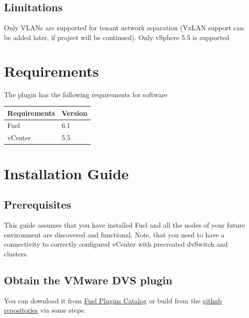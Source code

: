 \documentclass{article}
\begin{document}
\subsection{Limitations}
  Only VLANs are supported for tenant network separation (VxLAN support can be added later, if project will be continued).
  Only vSphere 5.5 is supported

\section{Requirements}

The plugin has the following requirements for software

\begin{table}[h]
\begin{tabular}{|p{8cm}|p{8cm}|}
\hline
\textbf{Requirements} & \textbf{Version} \\ \hline
Fuel & 6.1 \\ \hline
vCenter & 5.5 \\ \hline
\end{tabular}
\end{table}

\section{Installation Guide}

\subsection{Prerequisites}

This guide assumes that you have installed Fuel and all the nodes of your future environment are discovered and functional. Note, that you need to have a connectivity to correctly configured vCenter with precreated dvSwitch and clusters.

\subsection{Obtain the VMware DVS plugin}

You can download it from \href{https://www.mirantis.com/products/openstack-drivers-and-plugins/fuel-plugins/}{Fuel Plugins Catalog} or build from the \href{https://github.com/stackforge/fuel-plugin-vmware-dvs}{github repositories} via some steps:
\end{document}
